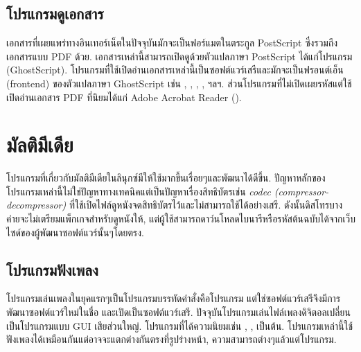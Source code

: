 \begin{thwbr}
\subsection{โปรแกรมดูเอกสาร}
เอกสารที่เผยแพร่ทางอินเทอร์เน็ตในปัจจุบันมักจะเป็นฟอร์แมตในตระกูล PostScript ซึ่งรวมถึงเอกสารแบบ PDF ด้วย. เอกสารเหล่านี้สามารถเปิดดูด้วยตัวแปลภาษา PostScript ได้แก่โปรแกรม  (GhostScript). โปรแกรมที่ใช้เปิดอ่านเอกสารเหล่านี้เป็นซอฟต์แวร์เสรีและมักจะเป็นฟรอนต์เอ็น (frontend) ของตัวแปลภาษา GhostScript เช่น , , , ,  ฯลฯ. ส่วนโปรแกรมที่ไม่เปิดเผยรหัสแต่ใช้เปิดอ่านเอกสาร PDF ที่นิยมได้แก่ Adobe Acrobat Reader ().

\begin{figure}[!hbt]
\end{figure}



\section{มัลติมีเดีย}
โปรแกรมที่เกี่ยวกับมัลติมีเดียในลินุกซ์มีให้ใช้มากขึ้นเรื่อยๆและพัฒนาได้ดีขึ้น. ปัญหาหลักของโปรแกรมเหล่านี้ไม่ใช่ปัญหาทางเทคนิคแต่เป็นปัญหาเรื่องสิทธิบัตรเช่น \emph{codec (compressor-decompressor)}  ที่ใช้เปิดไฟล์ดูหนังจดสิทธิบัตรไว้และไม่สามารถใช้ได้อย่างเสรี. ดังนั้นดิสโทรบางค่ายจะไม่เตรียมแพ็กเกจสำหรับดูหนังให้, แต่ผู้ใช้สามารถดาว์นโหลดไบนารีหรือรหัสต้นฉบับได้จากเว็บไซด์ของผู้พัฒนาซอฟต์แวร์นั้นๆโดยตรง.


\subsection{โปรแกรมฟังเพลง}
โปรแกรมเล่นเพลงในยุคแรกๆเป็นโปรแกรมบรรทัดคำสั่งคือโปรแกรม  แต่ใช่ซอฟต์แวร์เสรีจึงมีการพัฒนาซอฟต์แวร์ใหม่ในชื่อ  และเปิดเป็นซอฟต์แวร์เสรี. ปัจจุบันโปรแกรมเล่นไฟล์เพลงดิจิตอลเปลี่ยนเป็นโปรแกรมแบบ GUI เสียส่วนใหญ่. โปรแกรมที่ได้ความนิยมเช่น , ,  เป็นต้น. โปรแกรมเหล่านี้ใช้ฟังเพลงได้เหมือนกันแต่อาจจะแตกต่างกันตรงที่รูปร่างหน้า, ความสามารถต่างๆแล้วแต่โปรแกรม.


\end{thwbr}
